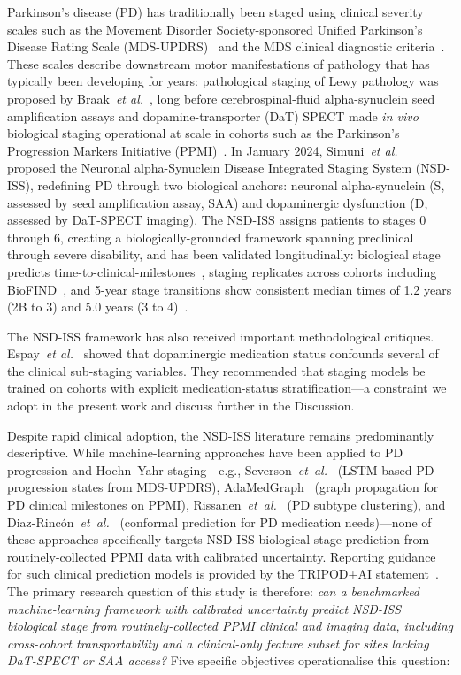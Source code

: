 \documentclass[10pt,letterpaper]{article}
\begin{document}
Parkinson's disease (PD) has traditionally been staged using clinical severity scales such as the Movement Disorder Society-sponsored Unified Parkinson's Disease Rating Scale (MDS-UPDRS)~\cite{goetz2008} and the MDS clinical diagnostic criteria~\cite{postuma2015}. These scales describe downstream motor manifestations of pathology that has typically been developing for years: pathological staging of Lewy pathology was proposed by Braak~\textit{et al.}~\cite{braak2003}, long before cerebrospinal-fluid alpha-synuclein seed amplification assays and dopamine-transporter (DaT) SPECT made \emph{in vivo} biological staging operational at scale in cohorts such as the Parkinson's Progression Markers Initiative (PPMI)~\cite{marek2018ppmi}. In January 2024, Simuni~\textit{et al.}~\cite{simuni2024} proposed the Neuronal alpha-Synuclein Disease Integrated Staging System (NSD-ISS), redefining PD through two biological anchors: neuronal alpha-synuclein (S, assessed by seed amplification assay, SAA) and dopaminergic dysfunction (D, assessed by DaT-SPECT imaging). The NSD-ISS assigns patients to stages 0 through 6, creating a biologically-grounded framework spanning preclinical through severe disability, and has been validated longitudinally: biological stage predicts time-to-clinical-milestones~\cite{simuni2024val}, staging replicates across cohorts including BioFIND~\cite{russo2025}, and 5-year stage transitions show consistent median times of 1.2 years (2B to 3) and 5.0 years (3 to 4)~\cite{simuni2025}.

The NSD-ISS framework has also received important methodological critiques. Espay~\textit{et al.}~\cite{espay2025med} showed that dopaminergic medication status confounds several of the clinical sub-staging variables. They recommended that staging models be trained on cohorts with explicit medication-status stratification---a constraint we adopt in the present work and discuss further in the Discussion.

Despite rapid clinical adoption, the NSD-ISS literature remains predominantly descriptive. While machine-learning approaches have been applied to PD progression and Hoehn--Yahr staging---e.g., Severson~\textit{et~al.}~\cite{severson2021nm} (LSTM-based PD progression states from MDS-UPDRS), AdaMedGraph~\cite{adamedgraph} (graph propagation for PD clinical milestones on PPMI), Rissanen~\textit{et~al.}~\cite{rissanen2022} (PD subtype clustering), and Diaz-Rinc\'{o}n~\textit{et~al.}~\cite{diazrincon2025} (conformal prediction for PD medication needs)---none of these approaches specifically targets NSD-ISS biological-stage prediction from routinely-collected PPMI data with calibrated uncertainty. Reporting guidance for such clinical prediction models is provided by the TRIPOD+AI statement~\cite{collins2024}. The primary research question of this study is therefore: \emph{can a benchmarked machine-learning framework with calibrated uncertainty predict NSD-ISS biological stage from routinely-collected PPMI clinical and imaging data, including cross-cohort transportability and a clinical-only feature subset for sites lacking DaT-SPECT or SAA access?} Five specific objectives operationalise this question:
\end{document}
